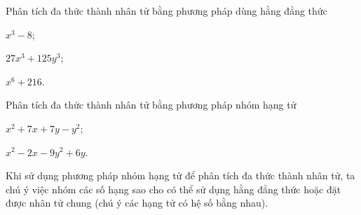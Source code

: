 \begin{vd}
	Phân tích đa thức thành nhân tử bằng phương pháp dùng hằng đẳng thức
	\begin{enumEX}{3}
		\item $ x^{3}-8 $;
		\item $ 27x^{3}+125y^{3} $;
		\item $ x^{6}+216 $.
	\end{enumEX}
\end{vd}
\begin{vd}
	Phân tích đa thức thành nhân tử bằng phương pháp nhóm hạng tử
	\begin{enumEX}{2}
		\item $ x^{2}+7x+7y-y^{2} $;
		\item $ x^{2}-2x-9y^{2}+6y $.
	\end{enumEX}
\begin{note}
Khi sử dụng phương pháp nhóm hạng tử để phân tích đa thức thành nhân tử, ta chú ý việc nhóm các số hạng sao cho có thể sử dụng hằng đẳng thức hoặc đặt được nhân tử chung (chú ý các hạng tử có hệ số bằng nhau).
\end{note}
\end{vd}
